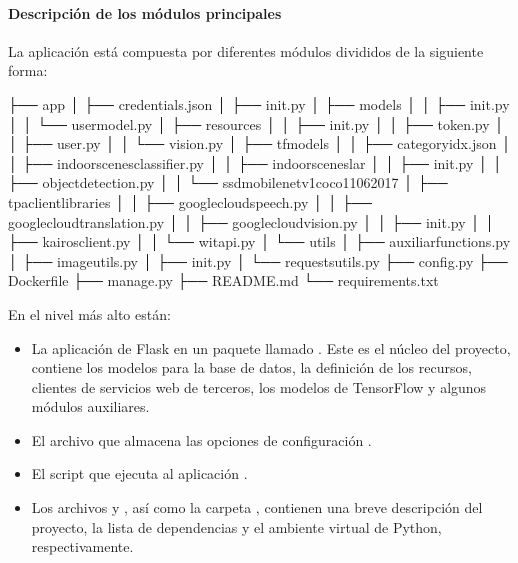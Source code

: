 \paragraph{Descripción de los módulos principales}
\label{\detokenize{chapter_two/desc_cloudnao:codigo}}
La aplicación está compuesta por diferentes módulos
divididos de la siguiente forma:

\begin{sphinxVerbatim}[commandchars=\\\{\}]
├── app
│   ├── credentials.json
│   ├── \PYGZus{}\PYGZus{}init\PYGZus{}\PYGZus{}.py
│   ├── models
│   │   ├── \PYGZus{}\PYGZus{}init\PYGZus{}\PYGZus{}.py
│   │   └── user\PYGZus{}model.py
│   ├── resources
│   │   ├── \PYGZus{}\PYGZus{}init\PYGZus{}\PYGZus{}.py
│   │   ├── token.py
│   │   ├── user.py
│   │   └── vision.py
│   ├── tf\PYGZus{}models
│   │   ├── category\PYGZus{}idx.json
│   │   ├── indoor\PYGZus{}scenes\PYGZus{}classifier.py
│   │   ├── indoor\PYGZus{}scenes\PYGZus{}lar
│   │   ├── \PYGZus{}\PYGZus{}init\PYGZus{}\PYGZus{}.py
│   │   ├── object\PYGZus{}detection.py
│   │   └── ssd\PYGZus{}mobilenet\PYGZus{}v1\PYGZus{}coco\PYGZus{}11\PYGZus{}06\PYGZus{}2017
│   ├── tpa\PYGZus{}client\PYGZus{}libraries
│   │   ├── google\PYGZus{}cloud\PYGZus{}speech.py
│   │   ├── google\PYGZus{}cloud\PYGZus{}translation.py
│   │   ├── google\PYGZus{}cloud\PYGZus{}vision.py
│   │   ├── \PYGZus{}\PYGZus{}init\PYGZus{}\PYGZus{}.py
│   │   ├── kairos\PYGZus{}client.py
│   │   └── wit\PYGZus{}api.py
│   └── utils
│       ├── auxiliar\PYGZus{}functions.py
│       ├── image\PYGZus{}utils.py
│       ├── \PYGZus{}\PYGZus{}init\PYGZus{}\PYGZus{}.py
│       └── requests\PYGZus{}utils.py
├── config.py
├── Dockerfile
├── manage.py
├── README.md
└── requirements.txt
\end{sphinxVerbatim}

En el nivel más alto están:
\begin{itemize}
\item {} 
La aplicación de Flask en un paquete llamado . Este es el núcleo del proyecto, contiene los modelos para la base de datos, la definición de los recursos, clientes de servicios web de terceros, los modelos de TensorFlow
y algunos módulos auxiliares.

\item {} 
El archivo que almacena las opciones de configuración .

\item {} 
El script que ejecuta al aplicación .

\item {} 
Los archivos  y , así como la carpeta , contienen una breve descripción del proyecto, la lista de dependencias y el ambiente virtual de Python, respectivamente.

\end{itemize}

